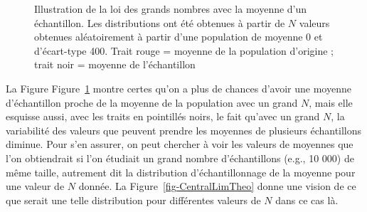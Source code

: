 \documentclass[
  letterpaper,
]{book}
\begin{document}
\begin{figure}


\caption{\label{fig-GreatNumLaw}Illustration de la loi des grands
nombres avec la moyenne d'un échantillon. Les distributions ont été
obtenues à partir de \(N\) valeurs obtenues aléatoirement à partir d'une
population de moyenne 0 et d'écart-type 400. Trait rouge = moyenne de la
population d'origine ; trait noir = moyenne de l'échantillon}

\end{figure}%

La Figure Figure~\ref{fig-GreatNumLaw} montre certes qu'on a plus de
chances d'avoir une moyenne d'échantillon proche de la moyenne de la
population avec un grand \(N\), mais elle esquisse aussi, avec les
traits en pointillés noirs, le fait qu'avec un grand \(N\), la
variabilité des valeurs que peuvent prendre les moyennes de plusieurs
échantillons diminue. Pour s'en assurer, on peut chercher à voir les
valeurs de moyennes que l'on obtiendrait si l'on étudiait un grand
nombre d'échantillons (e.g., 10 000) de même taille, autrement dit la
distribution d'échantillonnage de la moyenne pour une valeur de \(N\)
donnée. La Figure~\ref{fig-CentralLimTheo} donne une vision de ce que
serait une telle distribution pour différentes valeurs de \(N\) dans ce
cas là.
\end{document}
